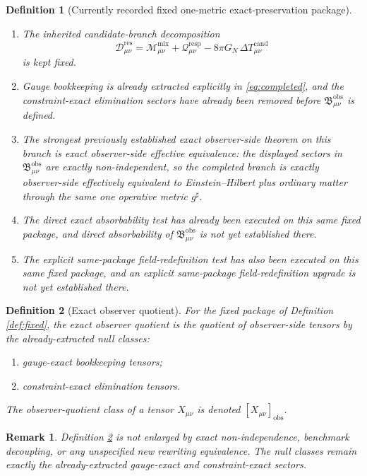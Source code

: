 \documentclass[11pt]{article}
\newcommand{\CompletedMetric}{g^{\sharp}}
\newcommand{\ResidualDec}{\mathcal D_{\mu\nu}^{\mathrm{res}}}
\newcommand{\MixQuad}{\mathcal M_{\mu\nu}^{\mathrm{mix}}}
\newcommand{\RespQuad}{\mathcal Q_{\mu\nu}^{\mathrm{resp}}}
\newcommand{\DeltaTCand}{\Delta T_{\mu\nu}^{\mathrm{cand}}}
\newcommand{\ObsBurden}{\mathfrak B_{\mu\nu}^{\mathrm{obs}}}
\newcommand{\ObserverClass}[1]{\left[#1\right]_{\mathrm{obs}}}
\newtheorem{definition}{Definition}
\newtheorem{remark}{Remark}
\begin{document}
\begin{definition}[Currently recorded fixed one-metric exact-preservation package]
\begin{enumerate}
    \item The inherited candidate-branch decomposition
    \begin{equation}
    \ResidualDec
    =
    \MixQuad+\RespQuad-8\pi G_N\,\DeltaTCand
    \label{eq:resdec}
    \end{equation}
    is kept fixed.
    \item Gauge bookkeeping is already extracted explicitly in \eqref{eq:completed}, and the constraint-exact elimination sectors have already been removed before \(\ObsBurden\) is defined.
    \item The strongest previously established exact observer-side theorem on this branch is exact observer-side effective equivalence: the displayed sectors in \(\ObsBurden\) are exactly non-independent, so the completed branch is exactly observer-side effectively equivalent to Einstein--Hilbert plus ordinary matter through the same one operative metric \(\CompletedMetric\).
    \item The direct exact absorbability test has already been executed on this same fixed package, and direct absorbability of \(\ObsBurden\) is not yet established there.
    \item The explicit same-package field-redefinition test has also been executed on this same fixed package, and an explicit same-package field-redefinition upgrade is not yet established there.
\end{enumerate}
\end{definition}

\begin{definition}[Exact observer quotient]
\label{def:quot}
For the fixed package of Definition \ref{def:fixed}, the \emph{exact observer quotient} is the quotient of observer-side tensors by the already-extracted null classes:
\begin{enumerate}
    \item gauge-exact bookkeeping tensors;
    \item constraint-exact elimination tensors.
\end{enumerate}
The observer-quotient class of a tensor \(X_{\mu\nu}\) is denoted \(\ObserverClass{X_{\mu\nu}}\).
\end{definition}

\begin{remark}
Definition \ref{def:quot} is not enlarged by exact non-independence, benchmark decoupling, or any unspecified new rewriting equivalence. The null classes remain exactly the already-extracted gauge-exact and constraint-exact sectors.
\end{remark}
\end{document}
